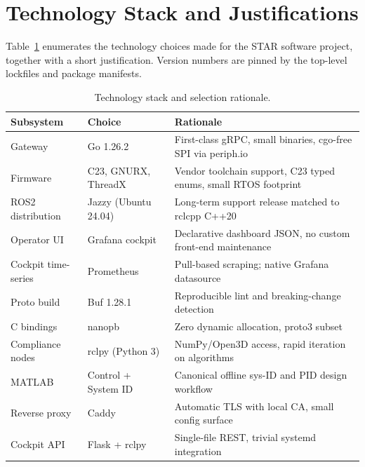 \documentclass[11pt,letterpaper]{article}
\begin{document}
\section{Technology Stack and Justifications}
\label{sec:tech-stack}

Table~\ref{tab:stack} enumerates the technology choices made for the
STAR software project, together with a short justification. Version
numbers are pinned by the top-level lockfiles and package manifests.

\begin{table}[H]
\centering
\caption{Technology stack and selection rationale.}
\label{tab:stack}
\small
\begin{tabularx}{\linewidth}{l l X}
\toprule
\textbf{Subsystem} & \textbf{Choice} & \textbf{Rationale} \\
\midrule
Gateway             & Go 1.26.2             & First-class gRPC, small binaries, cgo-free SPI via periph.io \\
Firmware            & C23, GNURX, ThreadX   & Vendor toolchain support, C23 typed enums, small RTOS footprint \\
ROS2 distribution   & Jazzy (Ubuntu 24.04)  & Long-term support release matched to rclcpp C++20 \\
Operator UI         & Grafana cockpit       & Declarative dashboard JSON, no custom front-end maintenance \\
Cockpit time-series & Prometheus            & Pull-based scraping; native Grafana datasource \\
Proto build         & Buf 1.28.1            & Reproducible lint and breaking-change detection \\
C bindings          & nanopb                & Zero dynamic allocation, proto3 subset \\
Compliance nodes    & rclpy (Python 3)      & NumPy/Open3D access, rapid iteration on algorithms \\
MATLAB              & Control + System ID   & Canonical offline sys-ID and PID design workflow \\
Reverse proxy       & Caddy                 & Automatic TLS with local CA, small config surface \\
Cockpit API         & Flask + rclpy         & Single-file REST, trivial systemd integration \\
\bottomrule
\end{tabularx}
\end{table}
\end{document}
